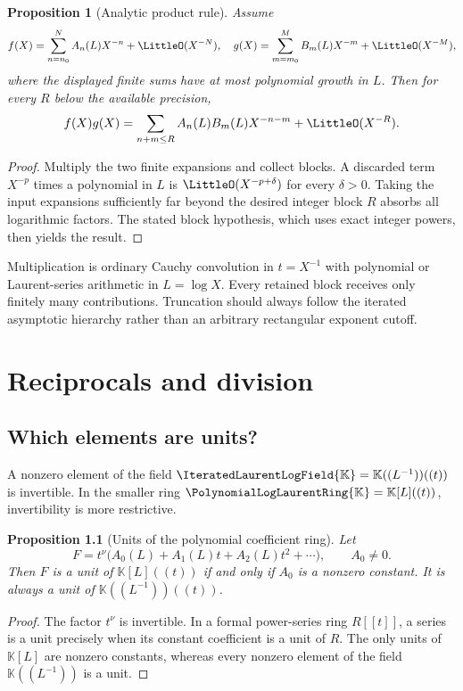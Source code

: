 \documentclass[11pt,oneside]{book}
\newtheorem{proposition}[theorem]{Proposition}
\theoremstyle{definition}
\theoremstyle{remark}
\newcommand{\K}{\mathbb K}
\newcommand{\PLpoly}{\PolynomialLogLaurentRing{\K}}
\newcommand{\PLfield}{\IteratedLaurentLogField{\K}}
\begin{document}
\begin{proposition}[Analytic product rule]\label{prop:analytic-product}
Assume
\[
 f(X)=\sum_{n=n_0}^{N}A_n(L)X^{-n}+\LittleO(X^{-N}),
 \quad
 g(X)=\sum_{m=m_0}^{M}B_m(L)X^{-m}+\LittleO(X^{-M}),
\]
where the displayed finite sums have at most polynomial growth in $L$.  Then
for every $R$ below the available precision,
\[
 f(X)g(X)=\sum_{n+m\le R}A_n(L)B_m(L)X^{-n-m}
 +\LittleO(X^{-R}).
\]
\end{proposition}
\begin{proof}
Multiply the two finite expansions and collect blocks.  A discarded term
$X^{-p}$ times a polynomial in $L$ is $\LittleO(X^{-p+\delta})$ for every
$\delta>0$.  Taking the input expansions sufficiently far beyond the desired
integer block $R$ absorbs all logarithmic factors.  The stated block
hypothesis, which uses exact integer powers, then yields the result.
\end{proof}

\begin{summarybox}
Multiplication is ordinary Cauchy convolution in $t=X^{-1}$ with polynomial or
Laurent-series arithmetic in $L=\log X$.  Every retained block receives only
finitely many contributions.  Truncation should always follow the iterated
asymptotic hierarchy rather than an arbitrary rectangular exponent cutoff.
\end{summarybox}


\chapter{Reciprocals and division}
\label{ch:division}

\section{Which elements are units?}
A nonzero element of the field $\PLfield=\K((L^{-1}))((t))$ is invertible.
In the smaller ring $\PLpoly=\K[L]((t))$, invertibility is more restrictive.

\begin{proposition}[Units of the polynomial coefficient ring]
Let
\[
 F=t^\nu\bigl(A_0(L)+A_1(L)t+A_2(L)t^2+\cdots\bigr),
 \qquad A_0\ne0.
\]
Then $F$ is a unit of $\K[L]((t))$ if and only if $A_0$ is a nonzero constant.
It is always a unit of $\K((L^{-1}))((t))$.
\end{proposition}
\begin{proof}
The factor $t^\nu$ is invertible.  In a formal power-series ring $R[[t]]$, a
series is a unit precisely when its constant coefficient is a unit of $R$.
The only units of $\K[L]$ are nonzero constants, whereas every nonzero element
of the field $\K((L^{-1}))$ is a unit.
\end{proof}
\end{document}
